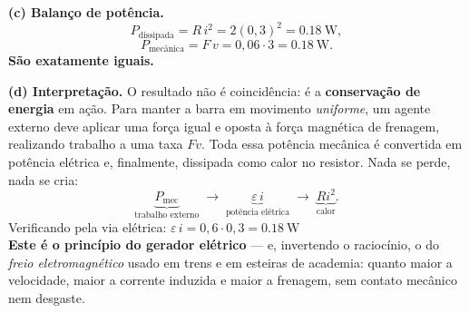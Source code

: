 \begin{questao}[4]{}
{\textbf{(c) Balanço de potência.}
\[
P_{\text{dissipada}} = R\,i^{2} = 2(0{,}3)^{2}=\SI{0.18}{\watt},
\]
\[
P_{\text{mecânica}} = F\,v = 0{,}06\cdot3 = \SI{0.18}{\watt}.
\]
\textbf{São exatamente iguais.}

\textbf{(d) Interpretação.} O resultado não é coincidência: é a
\textbf{conservação de energia} em ação. Para manter a barra em movimento
\emph{uniforme}, um agente externo deve aplicar uma força igual e oposta à força
magnética de frenagem, realizando trabalho a uma taxa $Fv$. Toda essa potência
mecânica é convertida em potência elétrica e, finalmente, dissipada como calor no
resistor. Nada se perde, nada se cria:
\[
\underbrace{P_{\text{mec}}}_{\text{trabalho externo}}
\;\longrightarrow\;
\underbrace{\varepsilon\,i}_{\text{potência elétrica}}
\;\longrightarrow\;
\underbrace{R i^{2}}_{\text{calor}}.
\]
Verificando pela via elétrica: $\varepsilon\,i = 0{,}6\cdot0{,}3
= \SI{0.18}{\watt}$ \checkmark\\
\textbf{Este é o princípio do gerador elétrico} --- e, invertendo o raciocínio, o
do \emph{freio eletromagnético} usado em trens e em esteiras de academia: quanto
maior a velocidade, maior a corrente induzida e maior a frenagem, sem contato
mecânico nem desgaste.}
\end{questao}



